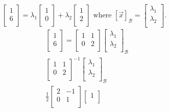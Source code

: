 \documentclass{report}
\begin{document}
{\[    \begin{bmatrix}
    1\\
    6\\
    \end{bmatrix}
    = \lambda_1 \begin{bmatrix}
    1\\
    0\\
    \end{bmatrix}
    + \lambda_2 \begin{bmatrix}
    1\\
    2\\
    \end{bmatrix}
     \text{ where } \left[ \vec{ x}  \right]_{ \mathcal{B}} = \begin{bmatrix}
     \lambda_1\\
     \lambda_2\\
     \end{bmatrix}
  .\] 
   \begin{align*}
    &  \begin{bmatrix}
     1\\
     6\\
     \end{bmatrix}  =   \begin{bmatrix}
     1 & 1\\
     0 & 2\\
     \end{bmatrix} \begin{bmatrix}
     \lambda_1\\
     \lambda_2\\
     \end{bmatrix}
     _{ \mathcal{B}}\\
     &  \begin{bmatrix}
     1 & 1\\
     0 & 2\\
     \end{bmatrix} ^{-1} \begin{bmatrix}
     \lambda_1\\
     \lambda_2\\
     \end{bmatrix}
     _{ \mathcal{B}} \\
     &  \frac{1}{2} \begin{bmatrix}
     2 & -1\\
     0 & 1\\
     \end{bmatrix} \begin{bmatrix}
     1\\

\end{bmatrix}
\end{align*}}
\end{document}
